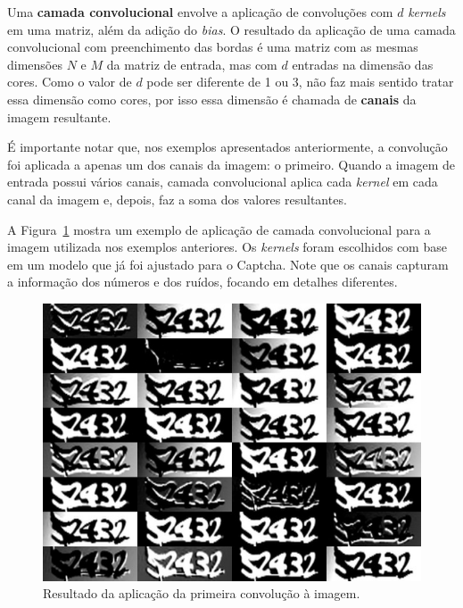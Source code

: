 \documentclass[12pt,twoside,brazilian]{book}
\begin{document}
Uma \textbf{camada convolucional} envolve a aplicação de convoluções com
\(d\) \emph{kernels} em uma matriz, além da adição do \emph{bias}. O
resultado da aplicação de uma camada convolucional com preenchimento das
bordas é uma matriz com as mesmas dimensões \(N\) e \(M\) da matriz de
entrada, mas com \(d\) entradas na dimensão das cores. Como o valor de
\(d\) pode ser diferente de 1 ou 3, não faz mais sentido tratar essa
dimensão como cores, por isso essa dimensão é chamada de \textbf{canais}
da imagem resultante.

É importante notar que, nos exemplos apresentados anteriormente, a
convolução foi aplicada a apenas um dos canais da imagem: o primeiro.
Quando a imagem de entrada possui vários canais, camada convolucional
aplica cada \emph{kernel} em cada canal da imagem e, depois, faz a soma
dos valores resultantes.

A Figura~\ref{fig-tjmg-exemplo-camada-conv} mostra um exemplo de
aplicação de camada convolucional para a imagem utilizada nos exemplos
anteriores. Os \emph{kernels} foram escolhidos com base em um modelo que
já foi ajustado para o Captcha. Note que os canais capturam a informação
dos números e dos ruídos, focando em detalhes diferentes.

\begin{figure}

{\centering \includegraphics{./assets/img/tjmg_conv1_modelo.jpeg}

}

\caption{\label{fig-tjmg-exemplo-camada-conv}Resultado da aplicação da
primeira convolução à imagem.}

\end{figure}
\end{document}
